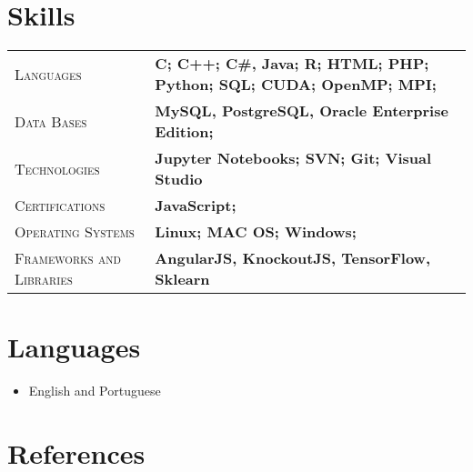 \documentclass[10pt, a4paper, oneside, final]{scrartcl} %
\newcommand{\gray}{\rowcolor[gray]{.90}} %
\begin{document}

\section{Skills}

\begin{center}
\begin{tabularx}{1.0\linewidth}{>{\raggedleft\scshape}p{3.2cm}X}
\gray Languages & \textbf{C; C++; C\#, Java; R; HTML; PHP; Python; SQL; CUDA; OpenMP; MPI;}\\
\gray Data Bases & \textbf{MySQL, PostgreSQL, Oracle Enterprise Edition;}\\
\gray Technologies & \textbf{Jupyter Notebooks; SVN; Git; Visual Studio}\\
\gray Certifications & \textbf{JavaScript;}\\
\gray Operating Systems & \textbf{Linux; MAC OS; Windows;}\\
\gray Frameworks and Libraries & \textbf{AngularJS, KnockoutJS, TensorFlow, Sklearn}\\
\end{tabularx}
\end{center}


\section{Languages}

\begin{itemize} \itemsep1.5pt \parskip0pt 
  \item English and Portuguese 
\end{itemize}


\section{References}
\end{document}
